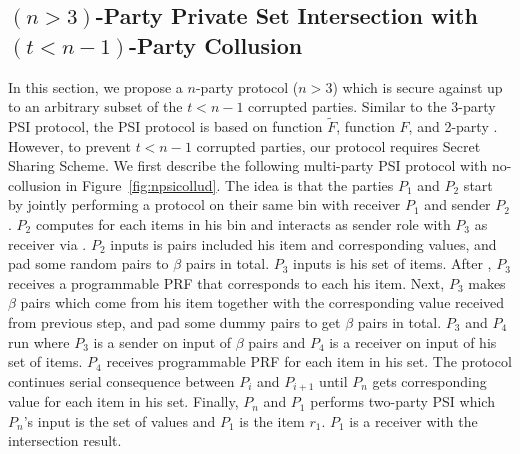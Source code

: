 \subsection{$(n>3)$-Party Private Set Intersection with $(t<n-1)$-Party Collusion}
\label{sect:npsi-construction}
In this section, we propose a $n$-party protocol ($n >3 $) which is secure against up to an arbitrary subset of the $t<n-1$ corrupted parties.
Similar to the 3-party PSI protocol, the PSI protocol is based on \batchOPRF function $\widetilde F$, \OPPRF function $F$, and 2-party \PSI. However, to prevent $t<n-1$ corrupted parties, our protocol requires Secret Sharing Scheme. We first describe the following multi-party PSI protocol with no-collusion in Figure~\ref{fig:npsicollud}. The idea is that the parties $P_1$ and $P_2$ start by jointly performing a \batchOPRF protocol on their same bin with receiver $P_1$ and sender $P_2$. $P_2$ computes \batchOPRF for each items in his bin and interacts as sender role with $P_3$ as receiver via \OPPRF. $P_2$ inputs is pairs included his item and corresponding \batchOPRF values, and pad some random pairs to $\beta$ pairs in total. $P_3$ inputs is his set of items. After \OPPRF, $P_3$ receives a programmable PRF that corresponds to each his item. Next, $P_3$ makes $\beta$ pairs which come from his item together with the corresponding \OPPRF value received from previous step, and pad some dummy pairs to get $\beta$ pairs in total. $P_3$ and $P_4$ run \OPPRF where $P_3$ is a sender on input of $\beta$ pairs and $P_4$ is a receiver on input of his set of items. $P_4$ receives  programmable PRF for each item in his set. The protocol continues serial consequence \OPPRF between $P_i$ and $P_{i+1}$ until $P_n$ gets corresponding \OPPRF value for each item in his set. Finally, $P_n$ and $P_1$ performs two-party PSI which $P_n$'s input is the set of  \OPPRF values and $P_1$ is the item $r_1$. $P_1$
is a receiver with the intersection result. 

